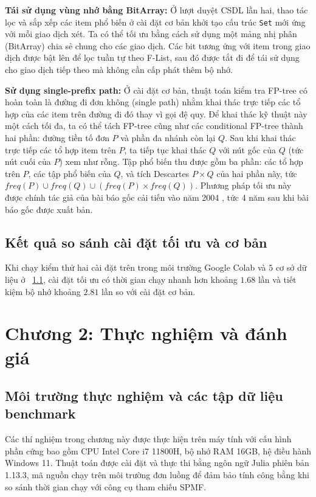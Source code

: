 \documentclass[conference]{IEEEtran}
\begin{document}
\textbf{Tái sử dụng vùng nhớ bằng BitArray:}
Ở lượt duyệt CSDL lần hai, thao tác lọc và sắp xếp các item phổ biến ở cài đặt cơ bản khởi tạo cấu trúc \texttt{Set} mới ứng với mỗi giao dịch xét. Ta có thể tối ưu bằng cách sử dụng một mảng nhị phân (BitArray) chia sẻ chung cho các giao dịch. Các bit tương ứng với item trong giao dịch được bật lên để lọc tuần tự theo F-List, sau đó được tắt đi để tái sử dụng cho giao dịch tiếp theo mà không cần cấp phát thêm bộ nhớ.

\textbf{Sử dụng single-prefix path:}
Ở cài đặt cơ bản, thuật toán kiểm tra FP-tree có hoàn toàn là đường đi đơn không (single path) nhằm khai thác trực tiếp các tổ hợp của các item trên đường đi đó thay vì gọi đệ quy. Để khai thác kỹ thuật này một cách tối đa, ta có thể tách FP-tree cũng như các conditional FP-tree thành hai phần: đường tiền tố đơn $P$ và phần đa nhánh còn lại $Q$. Sau khi khai thác trực tiếp các tổ hợp item trên $P$, ta tiếp tục khai thác $Q$ với nút gốc của $Q$ (tức nút cuối của $P$) xem như rỗng. Tập phổ biến thu được gồm ba phần: các tổ hợp trên $P$, các tập phổ biến của $Q$, và tích Descartes $P \times Q$ của hai phần này, tức $freq(P) \cup freq(Q) \cup (freq(P) \times freq(Q))$. Phương pháp tối ưu này được chính tác giả của bài báo gốc cải tiến vào năm 2004 \cite{han2004mining}, tức 4 năm sau khi bài báo gốc được xuất bản. 

\subsection{Kết quả so sánh cài đặt tối ưu và cơ bản}
Khi chạy kiểm thử hai cài đặt trên trong môi trường Google Colab và $5$ cơ sở dữ liệu ở ~\ref{subsec:environment-datasets}, cài đặt tối ưu có thời gian chạy nhanh hơn khoảng $1.68$ lần và tiết kiệm bộ nhớ khoảng $2.81$ lần so với cài đặt cơ bản.

\section{Chương 2: Thực nghiệm và đánh giá}

\subsection{Môi trường thực nghiệm và các tập dữ liệu benchmark}
\label{subsec:environment-datasets}

Các thí nghiệm trong chương này được thực hiện trên máy tính với cấu hình phần cứng bao gồm CPU Intel Core i7 11800H, bộ nhớ RAM 16GB, hệ điều hành Windows 11. Thuật toán được cài đặt và thực thi bằng ngôn ngữ Julia phiên bản 1.13.3, mã nguồn chạy trên môi trường đơn luồng để đảm bảo tính công bằng khi so sánh thời gian chạy với công cụ tham chiếu SPMF.
\end{document}
